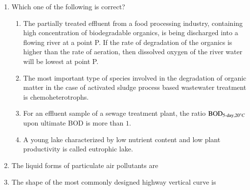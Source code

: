 \documentclass[journal,12pt,onecolumn]{article}
\theoremstyle{remark}
\begin{document}
\begin{enumerate}
\item Which one of the following is correct?
\hfill{}
\begin{enumerate}
    \item The partially treated effluent from a food processing industry, containing high concentration of biodegradable organics, is being discharged into a flowing river at a point P. If the rate of degradation of the organics is higher than the rate of aeration, then dissolved oxygen of the river water will be lowest at point P.
    \item The most important type of species involved in the degradation of organic matter in the case of activated sludge process based wastewater treatment is chemoheterotrophs.
    \item For an effluent sample of a sewage treatment plant, the ratio $\text{BOD}_{5\text{-day},20\degree C}$ upon ultimate BOD is more than $1$.
    \item A young lake characterized by low nutrient content and low plant productivity is called eutrophic lake.
\end{enumerate}

\item The liquid forms of particulate air pollutants are

\hfill{}
\begin{enumerate}
\end{enumerate}

\item The shape of the most commonly designed highway vertical curve is

\hfill{}
\begin{enumerate}
\end{enumerate}


\end{enumerate}
\end{document}
